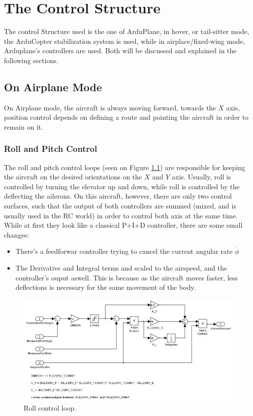 \chapter{The Control Structure}

The control Structure used is the one of ArduPlane, in hover, or tail-sitter mode, the ArduCopter stabilization system is used, while in airplace/fixed-wing mode, Arduplane's controllers are used. Both will be discussed and explained in the following sections.

\section{On Airplane Mode}

On Airplane mode, the aircraft is always moving forward, towards the $X$ axis, position control depends on defining a route and pointing the aircraft in order to remain on it.

\subsection{Roll and Pitch Control}

The roll and pitch control loops (seen on Figure \ref{fig:roll_loop}) are responsible for keeping the aircraft on the desired orientations on the $X$ and $Y$ axis. Usually, roll is controlled by turning the elevator up and down, while roll is controlled by the deflecting the ailerons. On this aircraft, however, there are only two control surfaces, such that the output of both controllers are summed (mixed, and is usually used in the RC world) in order to control both axis at the same time.
While at first they look like a classical P+I+D controller, there are some small changes:

\begin{itemize}
\item There's a feedforwar controller trying to cancel the current angular rate $\dot{\phi}$
\item The Derivative and Integral terms and scaled to the airspeed, and the controller's ouput aswell. This is because  as the aircraft moves faster, less deflections is necessary for the same movement of the body.
\end{itemize}


\begin{figure}[H]
\centering
  \includegraphics[width=\linewidth]{figs/roll_control_loop.jpg}
  \caption{Roll control loop.}
  \label{fig:roll_loop}
\end{figure}

